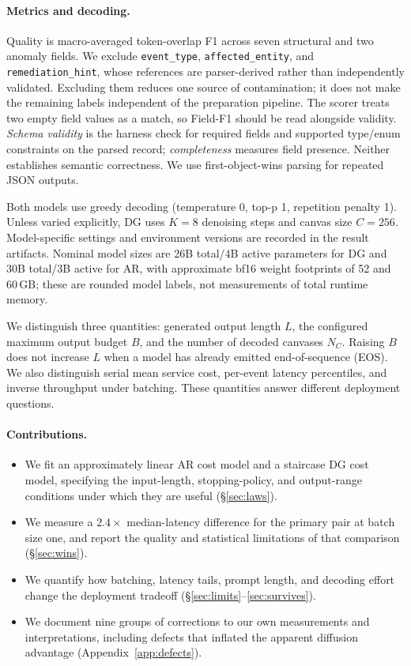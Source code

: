 \paragraph{Metrics and decoding.}
Quality is macro-averaged token-overlap F1 across seven structural and two
anomaly fields. We exclude \texttt{event\_type},
\texttt{affected\_entity}, and \texttt{remediation\_hint}, whose
references are parser-derived rather than independently validated.
Excluding them reduces one source of contamination; it does not make the
remaining labels independent of the preparation pipeline.
The scorer treats two empty field values as a match, so Field-F1 should be
read alongside validity. \emph{Schema validity} is the harness check for
required fields and supported type/enum constraints on the parsed record;
\emph{completeness} measures field presence. Neither establishes semantic
correctness. We use first-object-wins parsing for repeated JSON outputs.

Both models use greedy decoding (temperature 0, top-p 1, repetition
penalty 1). Unless varied explicitly, DG uses $K{=}8$ denoising steps
and canvas size $C{=}256$. Model-specific settings and environment versions
are recorded in the result artifacts. Nominal model sizes are 26B total/4B
active parameters for DG and 30B total/3B active for AR, with approximate
bf16 weight footprints of 52 and 60\,GB; these are rounded model labels,
not measurements of total runtime memory.

We distinguish three quantities: generated output length $L$, the configured
maximum output budget $B$, and the number of decoded canvases
$N_C$. Raising $B$ does not increase $L$ when a model has already emitted
end-of-sequence (EOS). We also distinguish serial mean service cost,
per-event latency percentiles, and inverse throughput under batching.
These quantities answer different deployment questions.

\paragraph{Contributions.}
\begin{itemize}
\item We fit an approximately linear AR cost model and a staircase DG cost
model, specifying the input-length, stopping-policy, and output-range
conditions under which they are useful (\S\ref{sec:laws}).
\item We measure a $2.4\times$ median-latency difference for the primary
pair at batch size one, and report the quality and statistical limitations
of that comparison (\S\ref{sec:wins}).
\item We quantify how batching, latency tails, prompt length, and decoding
effort change the deployment tradeoff (\S\ref{sec:limits}--\ref{sec:survives}).
\item We document nine groups of corrections to our own measurements and
interpretations, including defects that inflated the apparent diffusion
advantage (Appendix~\ref{app:defects}).
\end{itemize}

